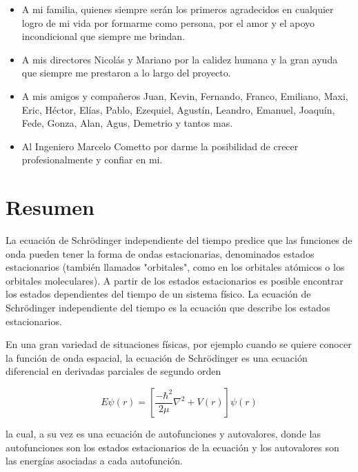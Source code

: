 \documentclass[a4paper,openright,12pt, oneside]{book}
\begin{document}
\begin{itemize}
\item A mi familia, quienes siempre ser\'an los primeros agradecidos en
cualquier logro de mi vida por formarme como persona, por el amor y el apoyo incondicional que siempre me brindan.

\item A mis directores Nicol\'as y Mariano por la calidez humana y la gran ayuda que siempre me prestaron a lo largo del proyecto.

\item A mis amigos y compa\~neros Juan, Kevin, Fernando, Franco, Emiliano, Maxi, Eric, H\'ector, El\'ias, Pablo, Ezequiel, Agust\'in, Leandro, Emanuel, Joaqu\'in, Fede, Gonza, Alan, Agus, Demetrio y tantos mas.

\item Al Ingeniero Marcelo Cometto por darme la posibilidad de crecer profesionalmente y confiar en mi.
\end{itemize}

\chapter*{\hspace{0.65cm}Resumen} %

La ecuaci\'on de Schr\"odinger independiente del tiempo predice que las funciones de onda pueden tener la forma de ondas estacionarias, denominados estados estacionarios (tambi\'en llamados "orbitales", como en los orbitales at\'omicos o los orbitales moleculares). A partir de los estados estacionarios es posible encontrar los estados dependientes del tiempo de un sistema f\'isico. La ecuaci\'on de Schr\"odinger independiente del tiempo es la ecuaci\'on que describe los estados estacionarios.

En una gran variedad de situaciones f\'isicas, por ejemplo cuando se quiere conocer la funci\'on de onda espacial, la ecuaci\'on de Schr\"odinger es una ecuaci\'on diferencial en derivadas parciales de segundo orden

\begin{displaymath}
    E\psi(r) = \left[\frac{-\hbar^2}{2\mu} \nabla^2 + V(r)\right]\psi(r)
\end{displaymath}

la cual, a su vez es una ecuaci\'on de autofunciones y autovalores, donde las autofunciones son los estados estacionarios de la ecuaci\'on y los autovalores son las energ\'ias asociadas a cada autofunci\'on.
\end{document}

